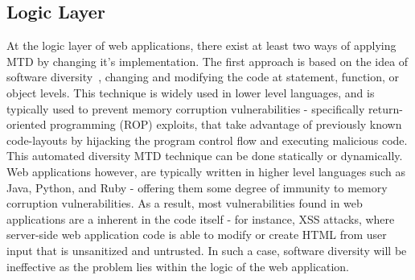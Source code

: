 \subsection{Logic Layer}
At the logic layer of web applications, there exist at least two ways of applying MTD by changing it's implementation.
The first approach is based on the idea of software diversity~\cite{larsen2014sok}, changing and modifying the code at statement, function, or object levels. This technique is widely used in lower level languages, and is typically used to prevent memory corruption vulnerabilities - specifically return-oriented programming (ROP) exploits, that take advantage of previously known code-layouts by hijacking the program control flow and executing malicious code. This automated diversity MTD technique can be done statically or dynamically. Web applications however, are typically written in higher level languages such as Java, Python, and Ruby - offering them some degree of immunity to memory corruption vulnerabilities. As a result, most vulnerabilities found in web applications are a inherent in the code itself - for instance, XSS attacks, where server-side web application code is able to modify or create HTML from user input that is unsanitized and untrusted. In such a case, software diversity will be ineffective as the problem lies within the logic of the web application.

